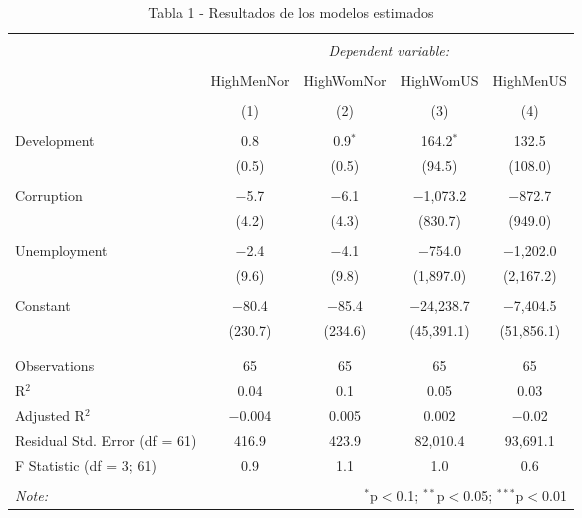 
\begin{table}[!htbp] \centering 
  \caption{Tabla 1 - Resultados de los modelos estimados} 
  \label{} 
\begin{tabular}{@{\extracolsep{5pt}}lcccc} 
\\[-1.8ex]\hline 
\hline \\[-1.8ex] 
 & \multicolumn{4}{c}{\textit{Dependent variable:}} \\ 
\cline{2-5} 
\\[-1.8ex] & HighMenNor & HighWomNor & HighWomUS & HighMenUS \\ 
\\[-1.8ex] & (1) & (2) & (3) & (4)\\ 
\hline \\[-1.8ex] 
 Development & 0.8 & 0.9$^{*}$ & 164.2$^{*}$ & 132.5 \\ 
  & (0.5) & (0.5) & (94.5) & (108.0) \\ 
  & & & & \\ 
 Corruption & $-$5.7 & $-$6.1 & $-$1,073.2 & $-$872.7 \\ 
  & (4.2) & (4.3) & (830.7) & (949.0) \\ 
  & & & & \\ 
 Unemployment & $-$2.4 & $-$4.1 & $-$754.0 & $-$1,202.0 \\ 
  & (9.6) & (9.8) & (1,897.0) & (2,167.2) \\ 
  & & & & \\ 
 Constant & $-$80.4 & $-$85.4 & $-$24,238.7 & $-$7,404.5 \\ 
  & (230.7) & (234.6) & (45,391.1) & (51,856.1) \\ 
  & & & & \\ 
\hline \\[-1.8ex] 
Observations & 65 & 65 & 65 & 65 \\ 
R$^{2}$ & 0.04 & 0.1 & 0.05 & 0.03 \\ 
Adjusted R$^{2}$ & $-$0.004 & 0.005 & 0.002 & $-$0.02 \\ 
Residual Std. Error (df = 61) & 416.9 & 423.9 & 82,010.4 & 93,691.1 \\ 
F Statistic (df = 3; 61) & 0.9 & 1.1 & 1.0 & 0.6 \\ 
\hline 
\hline \\[-1.8ex] 
\textit{Note:}  & \multicolumn{4}{r}{$^{*}$p$<$0.1; $^{**}$p$<$0.05; $^{***}$p$<$0.01} \\ 
\end{tabular} 
\end{table} 
